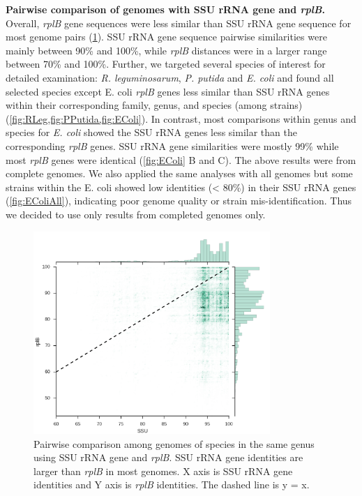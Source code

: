\documentclass[]{msu-thesis}
\begin{document}
\textbf{Pairwise comparison of genomes with SSU rRNA gene and \textit{rplB}. }
Overall, \textit{rplB} gene sequences were less similar than SSU rRNA gene sequence for most genome pairs (\cref{fig:interSpeciesComp}). SSU rRNA gene sequence pairwise similarities were mainly between 90\% and 100\%, while \textit{rplB} distances were in a larger range between 70\% and 100\%. Further, we targeted several species of interest for detailed examination: \textit{R. leguminosarum}, \textit{P. putida} and \textit{E. coli} and found all selected species except E. coli \textit{rplB} genes less similar than SSU rRNA genes within their corresponding family, genus, and species (among strains) (\cref{fig:RLeg,fig:PPutida,fig:EColi}). In contrast, most comparisons within genus and species for \textit{E. coli} showed the SSU rRNA genes less similar than the corresponding \textit{rplB} genes. SSU rRNA gene similarities were mostly 99\% while most \textit{rplB} genes were identical (\cref{fig:EColi} B and C). The above results were from complete genomes. We also applied the same analyses with all genomes but some strains within the E. coli showed low identities (< 80\%) in their SSU rRNA genes (\cref{fig:EColiAll}), indicating poor genome quality or strain mis-identification. Thus we decided to use only results from completed genomes only.


\begin{figure}[tbph!]
  \centering
  \includegraphics[width=0.80\textwidth]{figs/inter_species_comp}
  \caption[Pairwise comparison among genomes in the same genus using SSU rRNA gene and \textit{rplB}]{Pairwise comparison among genomes of species in the same genus using SSU rRNA gene and \textit{rplB}. SSU rRNA gene identities are larger than \textit{rplB} in most genomes. X axis is SSU rRNA gene identities and Y axis is \textit{rplB} identities. The dashed line is y = x.}
  \label{fig:interSpeciesComp}
\end{figure}
\end{document}
